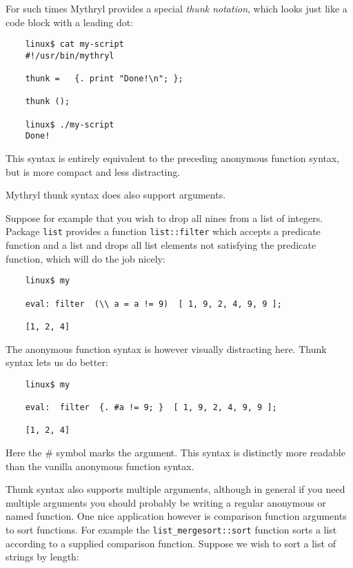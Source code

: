 For such times Mythryl provides a special {\it thunk notation}, 
which looks just like a code block with a leading dot:

\begin{verbatim}
    linux$ cat my-script
    #!/usr/bin/mythryl

    thunk =   {. print "Done!\n"; };

    thunk ();

    linux$ ./my-script
    Done!
\end{verbatim}

This syntax is entirely equivalent to the preceding 
anonymous function syntax, but is more compact and 
less distracting.

Mythryl thunk syntax does also support arguments.

Suppose for example that you wish to drop all nines 
from a list of integers.  Package {\tt list} provides 
a function {\tt list::filter} which accepts a predicate 
function and a list and drops all list elements not 
satisfying the predicate function, which will do the 
job nicely:

\begin{verbatim}
    linux$ my

    eval: filter  (\\ a = a != 9)  [ 1, 9, 2, 4, 9, 9 ];

    [1, 2, 4]
\end{verbatim}

The anonymous function syntax is however visually distracting 
here.  Thunk syntax lets us do better:

\begin{verbatim}
    linux$ my

    eval:  filter  {. #a != 9; }  [ 1, 9, 2, 4, 9, 9 ];

    [1, 2, 4]
\end{verbatim}

Here the \# symbol marks the argument.  This syntax is 
distinctly more readable than the vanilla anonymous function 
syntax.

Thunk syntax also supports multiple arguments, although in 
general if you need multiple arguments you should probably 
be writing a regular anonymous or named function.  One 
nice application however is comparison function arguments 
to sort functions.  For example the {\tt list\_mergesort::sort} 
function sorts a list according to a supplied comparison 
function.  Suppose we wish to sort a list of strings by length:

